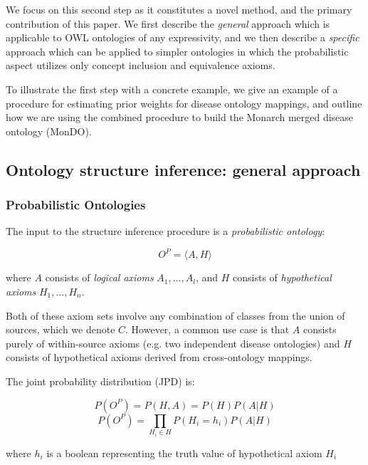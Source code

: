 \documentclass{my}
\newcommand{\eqnlabel}[1]{\label{eqn:#1}}
\begin{document}
We focus on this second step as it constitutes a novel method, and the
primary contribution of this paper. We first describe the
\emph{general} approach which is applicable to OWL ontologies of any
expressivity, and we then describe a \emph{specific} approach which
can be applied to simpler ontologies in which the probabilistic aspect
utilizes only concept inclusion and equivalence axioms.

To illustrate the first step with a concrete example, we give an
example of a procedure for estimating prior weights for disease
ontology mappings, and outline how we are using the combined procedure
to build the Monarch merged disease ontology (MonDO).

\subsection{Ontology structure inference: general approach}

\subsubsection{Probabilistic Ontologies}

The input to the structure inference procedure is a \emph{probabilistic ontology}:

\begin{equation}
O^P = \langle A,H \rangle
\end{equation}

where $A$ consists of \emph{logical axioms} $A_1,...,A_l$, and $H$ consists of \emph{hypothetical axioms}
$H_1,...,H_n$.

Both of these axiom sets involve any combination of
classes from the union of sources, which we denote $C$. However, a
common use case is that $A$ consists purely of within-source
axioms (e.g. two independent disease ontologies) and $H$ consists of
hypothetical axioms derived from cross-ontology mappings.

The joint probability distribution (JPD) is:

\begin{equation}
P(O^P) = P(H,A) = P(H)P(A|H)
\end{equation}
\begin{equation}
P(O^P) = \prod_{H_i \in H}P(H_i = h_i)P(A|H)
\eqnlabel{JointLikelihood}
\end{equation}

where $h_i$ is a boolean representing the truth value of hypothetical axiom $H_i$
\end{document}
